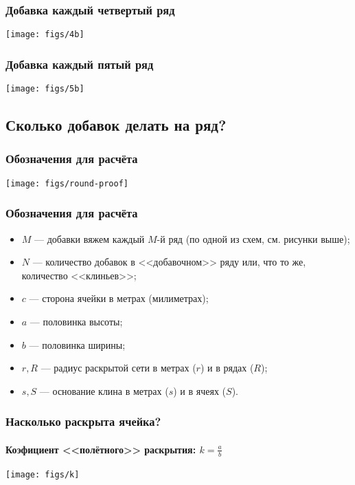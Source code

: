\begin{frame}
    \frametitle{Добавка каждый \alert{четвертый} ряд}

    \begin{center}
        \texttt{[image: figs/4b]}
    \end{center}
\end{frame}

\begin{frame}
    \frametitle{Добавка каждый \alert{пятый} ряд}

    \begin{center}
        \texttt{[image: figs/5b]}
    \end{center}
\end{frame}


\subsection{Сколько добавок делать на ряд?}

\begin{frame}
    \frametitle{Обозначения для расчёта}

    \begin{center}
        \texttt{[image: figs/round-proof]}
    \end{center}
\end{frame}

\begin{frame}
    \frametitle{Обозначения для расчёта}

	\begin{itemize}
		\item $M$ --- добавки вяжем каждый $M$-й ряд (по одной из схем, см. рисунки выше); 
		\item $N$ --- количество добавок в <<добавочном>> ряду или, что то же, количество <<клиньев>>; 
		\item $c$ --- сторона ячейки в метрах (милиметрах);
		\item $a$ --- половинка высоты; 
		\item $b$ --- половинка ширины; 
		\item $r,R$ --- радиус раскрытой сети в метрах ($r$) и в рядах ($R$); 
		\item $s,S$ --- основание клина в метрах ($s$) и в ячеях ($S$).
	\end{itemize}
\end{frame}

\begin{frame}
    \frametitle{Насколько раскрыта ячейка?}
    \framesubtitle{Коэфициент <<полётного>> раскрытия: $k=\frac{a}{b}$}

    \begin{center}
        \texttt{[image: figs/k]}
    \end{center}
\end{frame}

